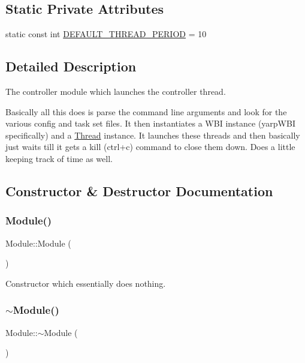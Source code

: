 \subsection*{Static Private Attributes}
\begin{DoxyCompactItemize}
\item 
static const int \hyperlink{classModule_af73cdfdae53c52ea8488d0d8c4f9083f}{D\+E\+F\+A\+U\+L\+T\+\_\+\+T\+H\+R\+E\+A\+D\+\_\+\+P\+E\+R\+I\+OD} = 10
\end{DoxyCompactItemize}


\subsection{Detailed Description}
The controller module which launches the controller thread. 

Basically all this does is parse the command line arguments and look for the various config and task set files. It then instantiates a W\+BI instance (yarp\+W\+BI specifically) and a \hyperlink{classThread}{Thread} instance. It launches these threads and then basically just waits till it gets a kill (ctrl+c) command to close them down. Does a little keeping track of time as well. 

\subsection{Constructor \& Destructor Documentation}
\hypertarget{classModule_a5a240a8a9ab1813b17bcb810b24ceaea}{}\label{classModule_a5a240a8a9ab1813b17bcb810b24ceaea} 
\subsubsection{\texorpdfstring{Module()}{Module()}}
{\footnotesize\ttfamily Module\+::\+Module (\begin{DoxyParamCaption}{ }\end{DoxyParamCaption})}

Constructor which essentially does nothing. \hypertarget{classModule_a7c9d9c096786d127590fdd8aa2b7d681}{}\label{classModule_a7c9d9c096786d127590fdd8aa2b7d681} 
\subsubsection{\texorpdfstring{$\sim$\+Module()}{~Module()}}
{\footnotesize\ttfamily Module\+::$\sim$\+Module (\begin{DoxyParamCaption}{ }\end{DoxyParamCaption})}

